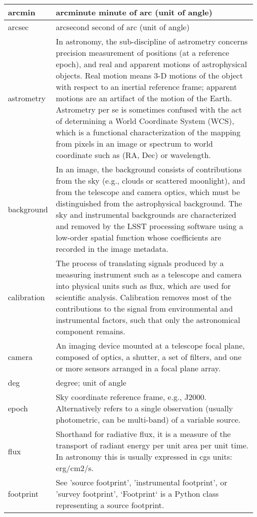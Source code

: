 \begin{longtable}{|l|p{}|}
arcmin & arcminute minute of arc (unit of angle) \\\hline
arcsec & arcsecond second of arc (unit of angle) \\\hline
astrometry & In astronomy, the sub-discipline of astrometry concerns precision measurement of positions (at a reference epoch), and real and apparent motions of astrophysical objects. Real motion means 3-D motions of the object with respect to an inertial reference frame; apparent motions are an artifact of the motion of the Earth. Astrometry per se is sometimes confused with the act of determining a World Coordinate System (WCS), which is a functional characterization of the mapping from pixels in an image or spectrum to world coordinate such as (RA, Dec) or wavelength. \\\hline
background & In an image, the background consists of contributions from the sky (e.g., clouds or scattered moonlight), and from the telescope and camera optics, which must be distinguished from the astrophysical background. The sky and instrumental backgrounds are characterized and removed by the LSST processing software using a low-order spatial function whose coefficients are recorded in the image metadata. \\\hline
calibration & The process of translating signals produced by a measuring instrument such as a telescope and camera into physical units such as flux, which are used for scientific analysis. Calibration removes most of the contributions to the signal from environmental and instrumental factors, such that only the astronomical component remains. \\\hline
camera & An imaging device mounted at a telescope focal plane, composed of optics, a shutter, a set of filters, and one or more sensors arranged in a focal plane array. \\\hline
deg & degree; unit of angle \\\hline
epoch & Sky coordinate reference frame, e.g., J2000. Alternatively refers to a single observation (usually photometric, can be multi-band) of a variable source. \\\hline
flux & Shorthand for radiative flux, it is a measure of the transport of radiant energy per unit area per unit time. In astronomy this is usually expressed in cgs units: erg/cm2/s. \\\hline
footprint & See 'source footprint', 'instrumental footprint', or 'survey footprint', `Footprint` is a Python class representing a source footprint. \\\hline

\end{longtable}
